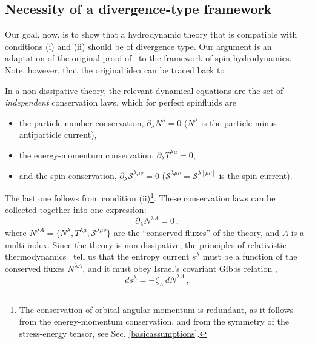 \documentclass[12pt,aps,prd,nofootinbib,noshowkeys,noshowpacs,longbibliography,
superscriptaddress,tightenlines,floatfix,preprintnumbers]{revtex4-2}
\begin{document}
\subsection{Necessity of a divergence-type framework}\label{framework}
%
Our goal, now, is to show that a hydrodynamic theory that is compatible with conditions (i) and (ii) should be of divergence type. Our argument is an adaptation of the original proof of~\cite{GerochLindblom1990} to the framework of spin hydrodynamics. Note, however, that the original idea can be traced back to~\cite{Friedrichs1974,Liu1986}.


In a non-dissipative theory, the relevant dynamical equations are the set of \emph{independent} conservation laws, which for perfect spinfluids are 
\begin{itemize}
    \item the particle number conservation, $\partial_\lambda N^\lambda=0$ ($N^\lambda$ is the particle-minus-antiparticle current),
    \item the energy-momentum conservation, $\partial_\lambda T^{\lambda \mu}=0$,
    \item and the spin conservation, $\partial_\lambda \mathcal{S}^{\lambda \mu \nu}=0$ ($\mathcal{S}^{\lambda \mu \nu}=\mathcal{S}^{\lambda [\mu \nu]}$ is the spin current).
\end{itemize}
The last one follows from condition (ii)\footnote{The conservation of orbital angular momentum is redundant, as it follows from the energy-momentum conservation, and from the symmetry of the stress-energy tensor, see Sec. \ref{basicassumptions}.}. These conservation laws can be collected together into one expression:
\begin{equation}\label{conservations}
    \partial_\lambda N^{\lambda A}=0 \, ,
\end{equation}
where $N^{\lambda A}= \{ N^\lambda, T^{\lambda \mu},\mathcal{S}^{\lambda \mu \nu} \}$ are the ``conserved fluxes'' of the theory, and $A$ is a multi-index. Since the theory is non-dissipative, the principles of relativistic thermodynamics~\cite{Israel_Stewart_1979,Callen_book,GavassinoTermometri} tell us that the entropy current $s^\lambda$ must be a function of the conserved fluxes $N^{\lambda A}$, and it must obey Israel's covariant Gibbs relation \cite{Israel_2009_inbook},
\begin{equation}\label{covariantGibbs}
    ds^\lambda = -\zeta_A \, dN^{\lambda A} \, ,
\end{equation}
\end{document}
